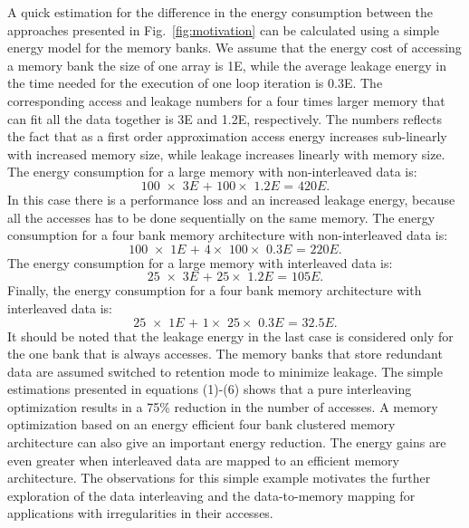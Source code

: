 A quick estimation for the difference in the energy consumption between the approaches presented in Fig.~\ref{fig:motivation} can be calculated using a simple energy model for the memory banks.
We assume that the energy cost of accessing a memory bank the size of one array is 1E, while the average leakage energy in the time needed for the execution of one loop iteration is 0.3E. 
The corresponding access and leakage numbers for a four times larger memory that can fit all the data together is  3E and 1.2E, respectively. 
The numbers reflects the fact that as a first order approximation access energy increases sub-linearly with increased memory size, while leakage increases linearly with memory size. 
The energy consumption for a large memory with non-interleaved data is:
	\begin{equation}
		\textit{100 $\times$ 3E + 100$\times$ 1.2E = 420E}.
	\end{equation}	
In this case there is a performance loss and an increased leakage energy, because all the accesses has to be done sequentially on the same memory.	
The energy consumption for a four bank memory architecture with non-interleaved data is:
	\begin{equation}
		\textit{100 $\times$ 1E + 4$\times$ 100$\times$ 0.3E = 220E}.
	\end{equation}	
The energy consumption for a large memory with interleaved data is:
	\begin{equation}
		\textit{25 $\times$ 3E + 25$\times$ 1.2E = 105E}.
	\end{equation}	
Finally, the energy consumption for a four bank memory architecture with interleaved data is:
	\begin{equation}
		\textit{25 $\times$ 1E + 1$\times$ 25$\times$ 0.3E = 32.5E}.
	\end{equation}			
It should be noted that the leakage energy in the last case is considered only for the one bank that is always accesses.
The memory banks that store redundant data are assumed switched to retention mode to minimize leakage.
The simple estimations presented in equations (1)-(6) shows that a pure interleaving optimization results in a 75\% reduction in the number of accesses.
A memory optimization based on an energy efficient four bank clustered memory architecture can also give an important energy reduction.
The energy gains are even greater when interleaved data are mapped to an efficient memory architecture.
The observations for this simple example motivates the further exploration of the data interleaving and the data-to-memory mapping for applications with irregularities in their accesses. 


